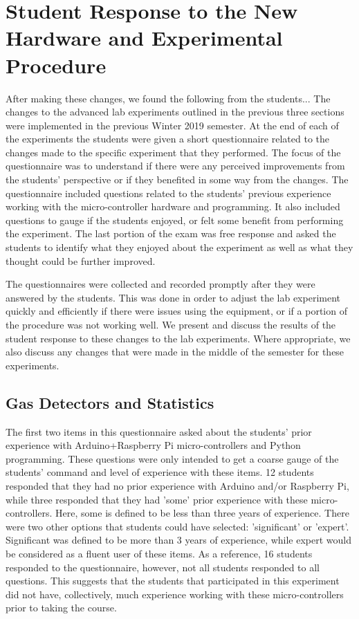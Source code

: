 \section{Student Response to the New Hardware and Experimental Procedure}
After making these changes, we found the following from the students...
The changes to the advanced lab experiments outlined in the previous three sections were implemented in the previous Winter 2019 semester.
At the end of each of the experiments the students were given a short questionnaire related to the changes made to the specific experiment that they performed.
The focus of the questionnaire was to understand if there were any perceived improvements from the students' perspective or if they benefited in some way from the changes.
The questionnaire included questions related to the students' previous experience working with the micro-controller hardware and programming.
It also included questions to gauge if the students enjoyed, or felt some benefit from performing the experiment.
The last portion of the exam was free response and asked the students to identify what they enjoyed about the experiment as well as what they thought could be further improved.

The questionnaires were collected and recorded promptly after they were answered by the students.
This was done in order to adjust the lab experiment quickly and efficiently if there were issues using the equipment, or if a portion of the procedure was not working well.
We present and discuss the results of the student response to these changes to the lab experiments.
Where appropriate, we also discuss any changes that were made in the middle of the semester for these experiments.

\subsection{Gas Detectors and Statistics}
The first two items in this questionnaire asked about the students' prior experience with Arduino+Raspberry Pi micro-controllers and Python programming.
These questions were only intended to get a coarse gauge of the students' command and level of experience with these items.
12 students responded that they had no prior experience with Arduino and/or Raspberry Pi, while three responded that they had 'some' prior experience with these micro-controllers.
Here, some is defined to be less than three years of experience.
There were two other options that students could have selected: 'significant' or 'expert'.
Significant was defined to be more than 3 years of experience, while expert would be considered as a fluent user of these items.
As a reference, 16 students responded to the questionnaire, however, not all students responded to all questions.
This suggests that the students that participated in this experiment did not have, collectively, much experience working with these micro-controllers prior to taking the course.

